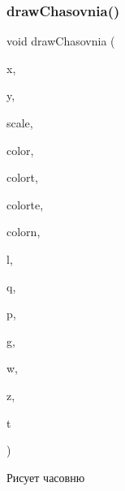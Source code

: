 \subsubsection{\texorpdfstring{draw\+Chasovnia()}{drawChasovnia()}}
{\footnotesize\ttfamily void draw\+Chasovnia (\begin{DoxyParamCaption}\item[{int}]{x,  }\item[{int}]{y,  }\item[{double}]{scale,  }\item[{C\+O\+L\+O\+R\+R\+EF}]{color,  }\item[{C\+O\+L\+O\+R\+R\+EF}]{colort,  }\item[{C\+O\+L\+O\+R\+R\+EF}]{colorte,  }\item[{C\+O\+L\+O\+R\+R\+EF}]{colorn,  }\item[{int}]{l,  }\item[{int}]{q,  }\item[{int}]{p,  }\item[{int}]{g,  }\item[{int}]{w,  }\item[{int}]{z,  }\item[{int}]{t }\end{DoxyParamCaption})}



Рисует часовню 


